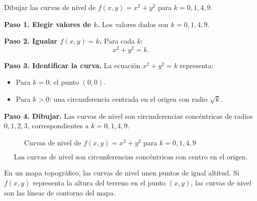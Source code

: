 \begin{example}
Dibujar las curvas de nivel de $f(x,y) = x^2 + y^2$ para
$k = 0, 1, 4, 9$.
\begin{myproof}
\textbf{Paso 1. Elegir valores de $k$.}
Los valores dados son $k = 0, 1, 4, 9$.

\textbf{Paso 2. Igualar $f(x,y) = k$.}
Para cada $k$:
\[
x^2 + y^2 = k.
\]

\textbf{Paso 3. Identificar la curva.}
La ecuación $x^2 + y^2 = k$ representa:
\begin{itemize}
  \item Para $k=0$: el punto $(0,0)$.
  \item Para $k>0$: una circunferencia centrada en el origen con radio
        $\sqrt{k}$.
\end{itemize}

\textbf{Paso 4. Dibujar.}
Las curvas de nivel son circunferencias concéntricas de radios
$0, 1, 2, 3$, correspondientes a $k=0,1,4,9$.

\begin{figure}[H]
\centering
{}
\caption{Curvas de nivel de $f(x,y)=x^2+y^2$ para $k=0,1,4,9$}
\label{fig:curvas_nivel_paraboloide}
\end{figure}

\[
\boxed{\text{Las curvas de nivel son circunferencias concéntricas con centro en el origen.}}
\]
\end{myproof}
\end{example}

\begin{rem}
En un mapa topográfico, las curvas de nivel unen puntos de igual
altitud. Si $f(x,y)$ representa la altura del terreno en el punto
$(x,y)$, las curvas de nivel son las líneas de contorno del mapa.
\end{rem}


